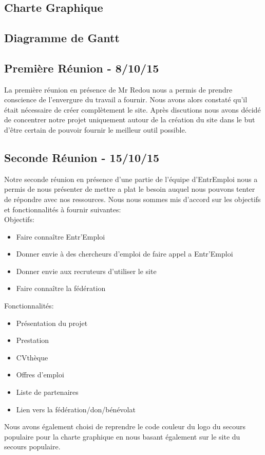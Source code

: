 \documentclass[12pt]{report}
\begin{document}
\newpage
\appendix
\chapter{}
\thispagestyle{fancy}
\section{Charte Graphique}
\section{Diagramme de Gantt}
\newpage
\section{Première Réunion - 8/10/15}
La première réunion en présence de Mr Redou nous a permis de prendre conscience de l'envergure du travail a fournir. Nous avons alors constaté qu'il était nécessaire de créer complètement le site. Après discutions nous avons décidé de concentrer notre projet uniquement autour de la création du site dans le but d’être certain de pouvoir fournir le meilleur outil possible.
\section{Seconde Réunion - 15/10/15}
Notre seconde réunion en présence d'une partie de l'équipe d'EntrEmploi nous a permis de nous présenter de mettre a plat le besoin auquel nous pouvons tenter de répondre avec nos ressources. Nous nous sommes mis d'accord sur les objectifs et fonctionnalités à fournir suivantes:\\
Objectifs:
\begin{itemize}
    \item Faire connaître Entr'Emploi
    \item Donner envie à des chercheurs d'emploi de faire appel a Entr'Emploi
    \item Donner envie aux recruteurs d'utiliser le site
    \item Faire connaître la fédération
\end{itemize}
Fonctionnalités:
\begin{itemize}
    \item Présentation du projet
    \item Prestation
    \item CVthèque
    \item Offres d'emploi
    \item Liste de partenaires
    \item Lien vers la fédération/don/bénévolat
\end{itemize}
Nous avons également choisi de reprendre le code couleur du logo du secours populaire pour la charte graphique en nous basant également sur le site du secours populaire.
\end{document}
